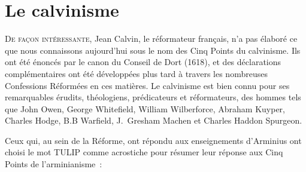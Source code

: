 \chapter{Le calvinisme}

\lettrine{D}{e façon intéressante,} Jean Calvin, le réformateur français, n'a pas élaboré
 ce que nous connaissons aujourd'hui sous le nom des Cinq Points du calvinisme.
 Ils ont été énoncés par le canon du Conseil de Dort (1618), et des déclarations
 complémentaires ont été développées plus tard à travers les nombreuses
 Confessions Réformées en ces matières. Le calvinisme est bien connu
 pour 
 ses remarquables érudits, théologiens, prédicateurs et réformateurs,
 des hommes tels que John Owen, George Whitefield,
 William Wilberforce, Abraham Kuyper, Charles Hodge, \pocketlinebreak
 B.B Warfield, J.~Gresham Machen et \pocketlinebreak
 Charles Haddon Spurgeon.

Ceux qui, au sein de la Réforme, ont répondu aux enseignements d'Arminius
 ont choisi le mot \og TULIP \fg{} comme acrostiche pour résumer
 leur réponse aux Cinq Points de l'arminianisme~:

